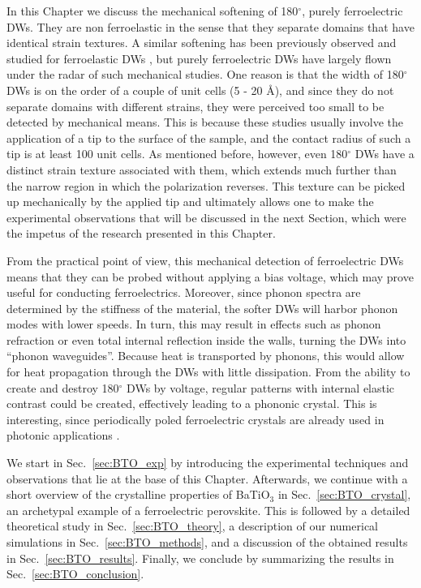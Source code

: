 In this Chapter we discuss the mechanical softening of 180$^\circ$, purely ferroelectric \glspl{DW}. They are non ferroelastic in the sense that they separate domains that have identical strain textures.
A similar softening has been previously observed and studied for ferroelastic \glspl{DW} \cite{Lee2003,Scott2012}, but purely ferroelectric \glspl{DW} have largely flown under the radar of such mechanical studies.
One reason is that the width of 180$^\circ$ \glspl{DW} is on the order of a couple of unit cells (5 - 20 \AA \cite{Zhirnov1959}), and since they do not separate domains with different strains, they were perceived too small to be detected by mechanical means.
This is because these studies usually involve the application of a tip to the surface of the sample, and the contact radius of such a tip is at least 100 unit cells.
As mentioned before, however, even 180$^\circ$ \glspl{DW} have a distinct strain texture associated with them, which extends much further than the narrow region in which the polarization reverses.
This texture can be picked up mechanically by the applied tip and ultimately allows one to make the experimental observations that will be discussed in the next Section, which were the impetus of the research presented in this Chapter.

From the practical point of view, this mechanical detection of ferroelectric \glspl{DW} means that they can be probed without applying a bias voltage, which may prove useful for conducting ferroelectrics. Moreover, since phonon spectra are determined by the stiffness of the material, the softer \glspl{DW} will harbor phonon modes with lower speeds. In turn, this may result in effects such as phonon refraction or even total internal reflection inside the walls, turning the \glspl{DW} into ``phonon waveguides''. Because heat is transported by phonons, this would allow for heat propagation through the \glspl{DW} with little dissipation. From the ability to create and destroy 180$^\circ$ \glspl{DW} by voltage, regular patterns with internal elastic contrast could be created, effectively leading to a phononic crystal.
This is interesting, since periodically poled ferroelectric crystals are already used in photonic applications \cite{Ferraro2014}.

We start in Sec.~\ref{sec:BTO_exp} by introducing the experimental techniques and observations that lie at the base of this Chapter. Afterwards, we continue with a short overview of the crystalline properties of BaTiO$_3$ in Sec.~\ref{sec:BTO_crystal}, an archetypal example of a ferroelectric perovskite.
This is followed by a detailed theoretical study in Sec.~\ref{sec:BTO_theory}, a description of our numerical simulations in Sec.~\ref{sec:BTO_methods}, and a discussion of the obtained results in Sec.~\ref{sec:BTO_results}.
Finally, we conclude by summarizing the results in Sec.~\ref{sec:BTO_conclusion}.

